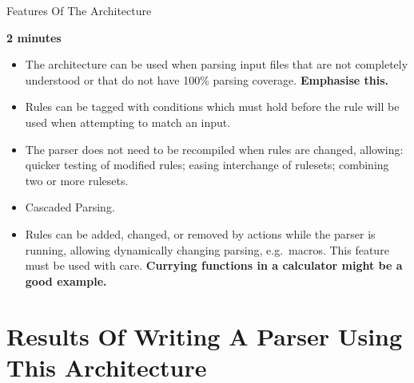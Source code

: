 \documentclass{beamer}
\newcommand{\timingnote}[1]{%
    \textbf{#1}%
}
\begin{document}
\begin{frame}{Features Of The Architecture}

    \timingnote{2 minutes}

    \begin{itemize}

        \item The architecture can be used when parsing input files that
            are not completely understood or that do not have 100\% parsing
            coverage.  \timingnote{Emphasise this.}

        \item Rules can be tagged with conditions which must hold before
            the rule will be used when attempting to match an input.

        \item The parser does not need to be recompiled when rules are
            changed, allowing: quicker testing of modified rules; easing
            interchange of rulesets; combining two or more rulesets.

        \item Cascaded Parsing.

        \item Rules can be added, changed, or removed by actions while the
            parser is running, allowing dynamically changing parsing, e.g.\
            macros.  This feature must be used with care.
            \timingnote{Currying functions in a calculator might be a good
            example.}

    \end{itemize}

\end{frame}


\section{Results Of Writing A Parser Using This Architecture}
\end{document}
